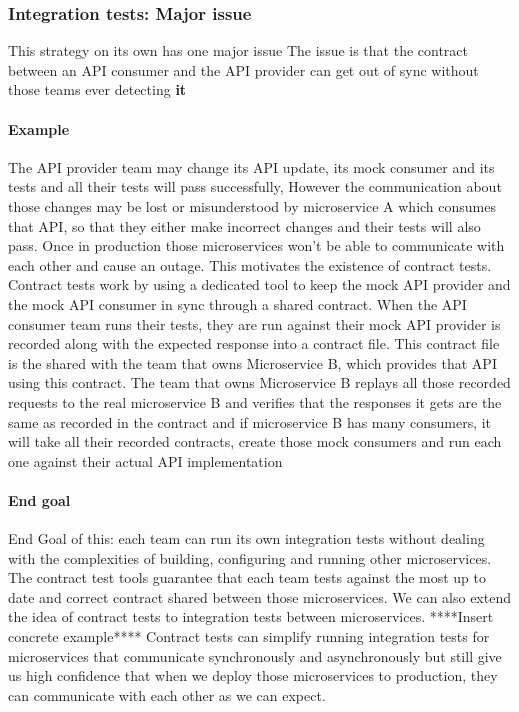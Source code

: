 \documentclass[a4paper, 11pt]{book}
\begin{document}
    \subsubsection{Integration tests: Major issue}
    This strategy on its own has one major issue
    The issue is that the contract between an API consumer and the API provider can get out of sync without those teams ever detecting \textbf{it}

    \paragraph{Example}
    The API provider team may change its API update, its mock consumer and its tests and all their tests will pass successfully,
    However the communication about those changes may be lost or misunderstood by microservice A which consumes that API, so that they either make incorrect changes and their tests will also pass.
    Once in production those microservices won't be able to communicate with each other and cause an outage.
    This motivates the existence of contract tests.
    Contract tests work by using a dedicated tool to keep the mock API provider and the mock API consumer in sync through a shared contract.
    When the API consumer team runs their tests, they are run against their mock API provider is recorded along with the expected response into a contract file.
    This contract file is the shared with the team that owns Microservice B, which provides that API using this contract.
    The team that owns Microservice B replays all those recorded requests to the real microservice B and verifies that the responses it gets are the same as recorded in the contract and if microservice B has many consumers, it will take all their recorded contracts, create those mock consumers and run each one against their actual API implementation

    \paragraph{End goal}
    End Goal of this: each team can run its own integration tests without dealing with the complexities of building, configuring and running other microservices.
    The contract test tools guarantee that each team tests against the most up to date and correct contract shared between those microservices.
    We can also extend the idea of contract tests to integration tests between microservices. ****Insert concrete example****
    Contract tests can simplify running integration tests for microservices that communicate synchronously and asynchronously but still give us high confidence that when we deploy those microservices to production, they can communicate with each other as we can expect.
\end{document}
